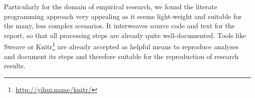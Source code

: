 \documentclass{acm_proc_article-sp}
\begin{document}
Particularly for the domain of empirical research, we found the literate programming approach very appealing as it seems light-weight and suitable for the many, less complex scenarios.
It interweaves source code and text for the report, so that all processing steps are already quite well-documented. 
Tools like Sweave \cite{lmucs_papers_Leisch_2002} or Knitr\footnote{\url{http://yihui.name/knitr/}} are already accepted as helpful means to reproduce analyses and document its steps
\cite{leisch2011executable}
%
\cite{rossini2003literate}
and therefore suitable for the reproduction of research results. 

%
%
%
%

\end{document}
